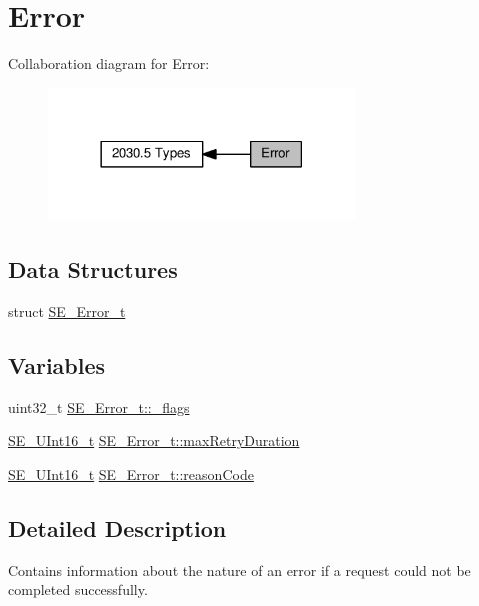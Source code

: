 \hypertarget{group__Error}{}\section{Error}
\label{group__Error}
Collaboration diagram for Error\+:\nopagebreak
\begin{figure}[H]
\begin{center}
\leavevmode
\includegraphics[width=230pt]{group__Error}
\end{center}
\end{figure}
\subsection*{Data Structures}
\begin{DoxyCompactItemize}
\item 
struct \hyperlink{structSE__Error__t}{S\+E\+\_\+\+Error\+\_\+t}
\end{DoxyCompactItemize}
\subsection*{Variables}
\begin{DoxyCompactItemize}
\item 
uint32\+\_\+t \hyperlink{group__Error_ga8aa22215f51b089c7bdb02b69c5fd9eb}{S\+E\+\_\+\+Error\+\_\+t\+::\+\_\+flags}
\item 
\hyperlink{group__UInt16_gac68d541f189538bfd30cfaa712d20d29}{S\+E\+\_\+\+U\+Int16\+\_\+t} \hyperlink{group__Error_ga0e519f8abdfdbf90cb4262b3670c8a87}{S\+E\+\_\+\+Error\+\_\+t\+::max\+Retry\+Duration}
\item 
\hyperlink{group__UInt16_gac68d541f189538bfd30cfaa712d20d29}{S\+E\+\_\+\+U\+Int16\+\_\+t} \hyperlink{group__Error_gac36d2114ba2736c8052d850778818b78}{S\+E\+\_\+\+Error\+\_\+t\+::reason\+Code}
\end{DoxyCompactItemize}


\subsection{Detailed Description}
Contains information about the nature of an error if a request could not be completed successfully. 

